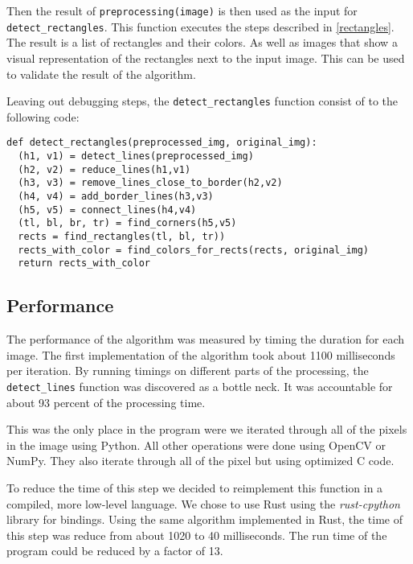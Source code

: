 
Then the result of \texttt{preprocessing(image)} is then used as the input for
\texttt{detect\_rectangles}. This function executes the steps described in
\ref{rectangles}. The result is a list of rectangles and their colors. As
well as images that show a visual representation of the rectangles next to
the input image. This can be used to validate the result of the algorithm.

Leaving out debugging steps, the \texttt{detect\_rectangles} function consist of
to the following code:

\begin{lstlisting}
def detect_rectangles(preprocessed_img, original_img):
  (h1, v1) = detect_lines(preprocessed_img)
  (h2, v2) = reduce_lines(h1,v1)
  (h3, v3) = remove_lines_close_to_border(h2,v2)
  (h4, v4) = add_border_lines(h3,v3)
  (h5, v5) = connect_lines(h4,v4)
  (tl, bl, br, tr) = find_corners(h5,v5)
  rects = find_rectangles(tl, bl, tr))
  rects_with_color = find_colors_for_rects(rects, original_img)
  return rects_with_color
\end{lstlisting}

\subsection{Performance} \label{performance}

The performance of the algorithm was measured by timing the duration for each
image. The first implementation of the algorithm took about 1100 milliseconds per
iteration. By running timings on different parts of the processing, the
\texttt{detect\_lines} function was discovered as a bottle neck. It was
accountable for about 93 percent of the processing time.

This was the only place in the program were we iterated through all of the pixels
in the image using Python. All other operations were done using OpenCV or NumPy.
They also iterate through all of the pixel but using optimized C code.

To reduce the time of this step we decided to reimplement this function in a
compiled, more low-level language. We chose to use Rust using the \textit{rust-cpython}
library for bindings. Using the same algorithm implemented in Rust, the time of
this step was reduce from about 1020 to 40 milliseconds. The run time of the
program could be reduced by a factor of 13.

